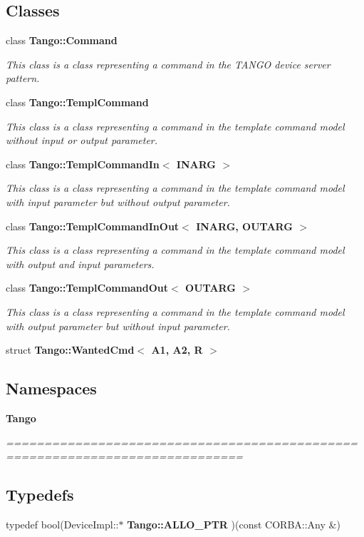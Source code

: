 \subsection*{Classes}
\begin{DoxyCompactItemize}
\item 
class {\bf Tango\-::\-Command}
\begin{DoxyCompactList}\small\item\em This class is a class representing a command in the T\-A\-N\-G\-O device server pattern. \end{DoxyCompactList}\item 
class {\bf Tango\-::\-Templ\-Command}
\begin{DoxyCompactList}\small\item\em This class is a class representing a command in the template command model without input or output parameter. \end{DoxyCompactList}\item 
class {\bf Tango\-::\-Templ\-Command\-In$<$ I\-N\-A\-R\-G $>$}
\begin{DoxyCompactList}\small\item\em This class is a class representing a command in the template command model with input parameter but without output parameter. \end{DoxyCompactList}\item 
class {\bf Tango\-::\-Templ\-Command\-In\-Out$<$ I\-N\-A\-R\-G, O\-U\-T\-A\-R\-G $>$}
\begin{DoxyCompactList}\small\item\em This class is a class representing a command in the template command model with output and input parameters. \end{DoxyCompactList}\item 
class {\bf Tango\-::\-Templ\-Command\-Out$<$ O\-U\-T\-A\-R\-G $>$}
\begin{DoxyCompactList}\small\item\em This class is a class representing a command in the template command model with output parameter but without input parameter. \end{DoxyCompactList}\item 
struct {\bf Tango\-::\-Wanted\-Cmd$<$ A1, A2, R $>$}
\end{DoxyCompactItemize}
\subsection*{Namespaces}
\begin{DoxyCompactItemize}
\item 
{\bf Tango}
\begin{DoxyCompactList}\small\item\em ============================================================================= \end{DoxyCompactList}\end{DoxyCompactItemize}
\subsection*{Typedefs}
\begin{DoxyCompactItemize}
\item 
typedef bool(Device\-Impl\-::$\ast$ {\bf Tango\-::\-A\-L\-L\-O\-\_\-\-P\-T\-R} )(const C\-O\-R\-B\-A\-::\-Any \&)
\end{DoxyCompactItemize}
